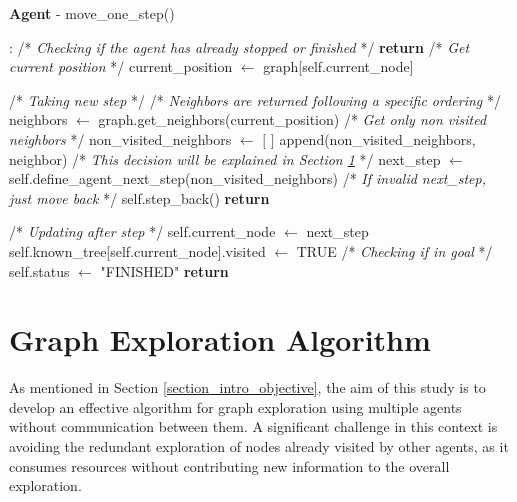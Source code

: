 \begin{algorithm}
\caption{\textbf{Agent} - move\_one\_step()}
\label{alg:move_one_step}
\begin{algorithmic}
    :
    \State /* \textit{Checking if the agent has already stopped or finished} */
        \State \textbf{return}
    \EndIf
    \State
    \State /* \textit{Get current position} */
    \State current\_position $\gets$ graph[self.current\_node]

    \State
    \State /* \textit{Taking new step} */
    \State /* \textit{Neighbors are returned following a specific ordering} */
    \State neighbors $\gets$ graph.get\_neighbors(current\_position)
    \State /* \textit{Get only non visited neighbors} */
    \State non\_visited\_neighbors $\gets$ $[$ $ ]$
            \State append(non\_visited\_neighbors, neighbor)
        \EndIf
    \EndFor
    \State /* \textit{This decision will be explained in Section \ref{section_method_algorithm}} */
    \State next\_step $\gets$ self.define\_agent\_next\_step(non\_visited\_neighbors)
    \State /* \textit{If invalid next\_step, just move back} */
        \State self.step\_back()
        \State \textbf{return}
    \EndIf

    \State
    \State /* \textit{Updating after step} */
    \State self.current\_node $\gets$ next\_step
    \State self.known\_tree[self.current\_node].visited $\gets$ TRUE
    \State
    \State /* \textit{Checking if in goal} */
        \State self.status $\gets$ "FINISHED"
        \State \textbf{return}
    \EndIf

    

    \EndProcedure
\end{algorithmic}
\end{algorithm}

\section{Graph Exploration Algorithm}
\label{section_method_algorithm}
As mentioned in Section \ref{section_intro_objective},
the aim of this study is to develop an effective algorithm for graph exploration using multiple agents without communication between them.
A significant challenge in this context is avoiding the redundant exploration of nodes already visited by other agents,
as it consumes resources without contributing new information to the overall exploration.

